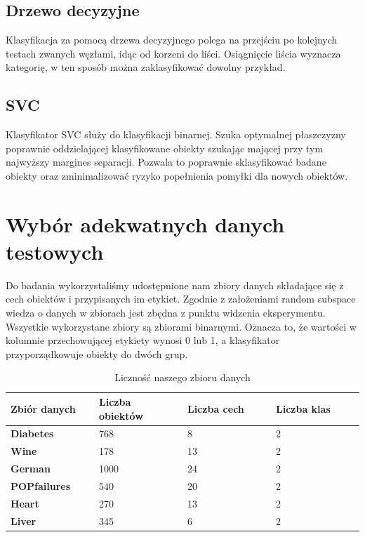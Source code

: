 \documentclass[12pt,onecolumn,technote]{IEEEtran}
\begin{document}
\subsection{Drzewo decyzyjne}
Klasyfikacja za pomocą drzewa decyzyjnego polega na przejściu po kolejnych testach zwanych węzłami, idąc od korzeni do liści. Osiągnięcie liścia wyznacza kategorię, w ten sposób można zaklasyfikować dowolny przykład.
\subsection{SVC}
Klasyfikator SVC służy do klasyfikacji binarnej. Szuka optymalnej płaszczyzny poprawnie oddzielającej klasyfikowane obiekty szukając mającej przy tym najwyższy margines separacji. Pozwala to poprawnie sklasyfikować badane obiekty oraz zminimalizować ryzyko popełnienia pomyłki dla nowych obiektów.


\section{Wybór adekwatnych danych testowych}

Do badania wykorzystaliśmy udostępnione nam zbiory danych składające się z cech obiektów i przypisanych im etykiet. Zgodnie z założeniami random subspace wiedza o danych w zbiorach jest zbędna z punktu widzenia eksperymentu. Wszystkie wykorzystane zbiory są zbiorami binarnymi. Oznacza to, że wartości w kolumnie przechowującej etykiety wynosi 0 lub 1, a klasyfikator przyporządkowuje obiekty do dwóch grup.

\vspace{12pt}
\begin{table}[h]
    \large
    \caption{Liczność naszego zbioru danych}
    \begin{tabular}{|p{0.25\linewidth}|p{0.25\linewidth}|p{0.25\linewidth}|p{0.25\linewidth}|}
\hline
     \textbf{Zbiór danych} & \textbf{Liczba obiektów} & \textbf{Liczba cech} & \textbf{Liczba klas} \\
\hline
     \textbf{Diabetes} & 768 & 8 & 2 \\
\hline
     \textbf{Wine} & 178 & 13 & 2 \\
\hline
     \textbf{German} & 1000 & 24 & 2 \\
\hline
     \textbf{POPfailures} & 540 & 20 & 2 \\
\hline
     \textbf{Heart} & 270 & 13 & 2 \\
\hline
     \textbf{Liver} & 345 & 6 & 2 \\
\hline
\end{tabular}
\end{table}
\vspace{12pt}
\end{document}
